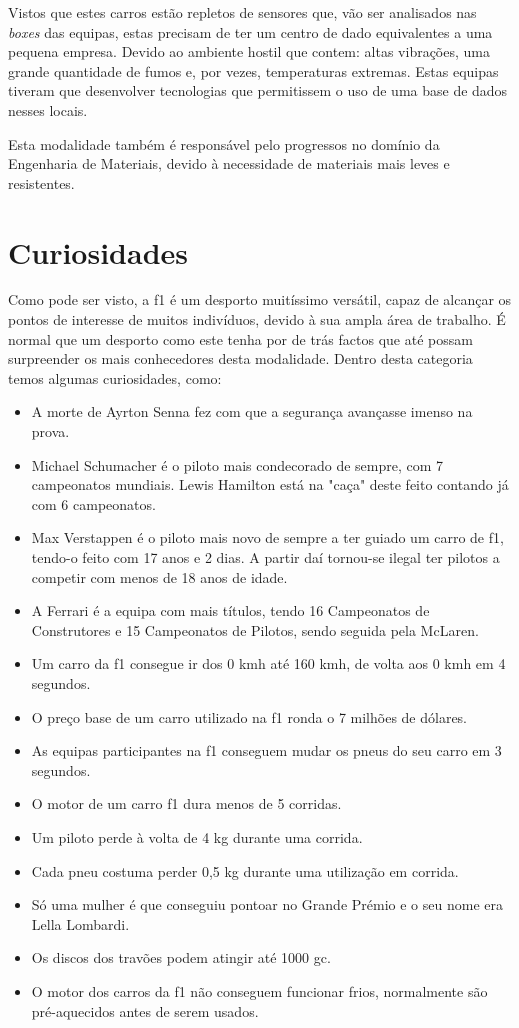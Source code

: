 \documentclass{report}
\begin{document}
Vistos que estes carros estão repletos de sensores que, vão ser analisados nas \textit{boxes} das equipas, estas precisam de ter um centro de dado equivalentes a uma pequena empresa. Devido ao ambiente hostil que contem: altas vibrações, uma grande quantidade de fumos e, por vezes, temperaturas extremas. Estas equipas tiveram que desenvolver tecnologias que permitissem o uso de uma base de dados nesses locais.

Esta modalidade também é responsável pelo progressos no domínio da Engenharia de Materiais, devido à necessidade de materiais mais leves e resistentes.
\chapter{Curiosidades}
\label{chap.curiosidades}
\hspace{\parindent}Como pode ser visto, a \ac{f1} é um desporto muitíssimo versátil, capaz de alcançar os pontos de interesse de muitos indivíduos, devido à sua ampla área de trabalho. É normal que um desporto como este tenha por de trás factos que até possam surpreender os mais conhecedores desta modalidade. Dentro desta categoria temos algumas curiosidades, como:
\begin{itemize}
    \item A morte de Ayrton Senna fez com que a segurança avançasse imenso na prova.
    \item Michael Schumacher é o piloto mais condecorado de sempre, com 7 campeonatos mundiais. Lewis Hamilton está na "caça" deste feito contando já com 6 campeonatos.
    \item Max Verstappen é o piloto  mais novo de sempre a ter guiado um carro de \ac{f1}, tendo-o feito com 17 anos e 2 dias. A partir daí tornou-se ilegal ter pilotos a competir com menos de 18 anos de idade.
    \item A Ferrari é a equipa com mais títulos, tendo 16 Campeonatos de Construtores e 15 Campeonatos de Pilotos, sendo seguida pela McLaren.
    \item Um carro da \ac{f1} consegue ir dos 0 \ac{kmh} até 160 \ac{kmh}, de volta aos 0 \ac{kmh} em 4 segundos.
    \item O preço base de um carro utilizado na \ac{f1} ronda o 7 milhões de dólares.
    \item As equipas participantes na \ac{f1} conseguem mudar os pneus do seu carro em 3 segundos.
    \item O motor de um carro \ac{f1} dura menos de 5 corridas.
    \item Um piloto perde à volta de 4 \ac{kg} durante uma corrida.
    \item Cada pneu costuma perder 0,5 \ac{kg} durante uma utilização em corrida.
    \item Só uma mulher é que conseguiu pontoar no Grande Prémio e o seu nome era Lella Lombardi.
    \item Os discos dos travões podem atingir até 1000 \ac{gc}.
    \item O motor dos carros da \ac{f1} não conseguem funcionar frios, normalmente são pré-aquecidos antes de serem usados.
\end{itemize}
\end{document}
